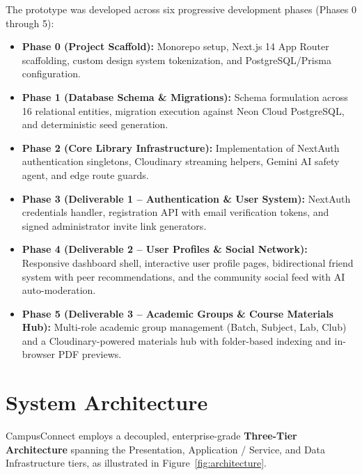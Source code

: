 \documentclass[11pt,a4paper]{report}
\begin{document}
The prototype was developed across six progressive development phases (Phases 0 through 5):

\begin{itemize}
    \item \textbf{Phase 0 (Project Scaffold):} Monorepo setup, Next.js 14 App Router scaffolding, custom design system tokenization, and PostgreSQL/Prisma configuration.
    \item \textbf{Phase 1 (Database Schema \& Migrations):} Schema formulation across 16 relational entities, migration execution against Neon Cloud PostgreSQL, and deterministic seed generation.
    \item \textbf{Phase 2 (Core Library Infrastructure):} Implementation of NextAuth authentication singletons, Cloudinary streaming helpers, Gemini AI safety agent, and edge route guards.
    \item \textbf{Phase 3 (Deliverable 1 -- Authentication \& User System):} NextAuth credentials handler, registration API with email verification tokens, and signed administrator invite link generators.
    \item \textbf{Phase 4 (Deliverable 2 -- User Profiles \& Social Network):} Responsive dashboard shell, interactive user profile pages, bidirectional friend system with peer recommendations, and the community social feed with AI auto-moderation.
    \item \textbf{Phase 5 (Deliverable 3 -- Academic Groups \& Course Materials Hub):} Multi-role academic group management (Batch, Subject, Lab, Club) and a Cloudinary-powered materials hub with folder-based indexing and in-browser PDF previews.
\end{itemize}

\section{System Architecture}

CampusConnect employs a decoupled, enterprise-grade \textbf{Three-Tier Architecture} spanning the Presentation, Application / Service, and Data Infrastructure tiers, as illustrated in Figure~\ref{fig:architecture}.
\end{document}
